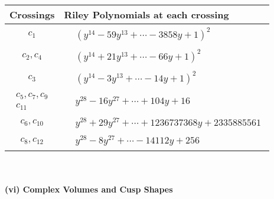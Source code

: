 \documentclass[1p]{elsarticle_modified}
\theoremstyle{definition}
\begin{document}
\begin{tabular}{m{50pt}|m{274pt}}
Crossings & \hspace{64pt}Riley Polynomials at each crossing \\
\hline $$\begin{aligned}c_{1}\end{aligned}$$&$\begin{aligned}
&(y^{14}-59 y^{13}+\cdots-3858 y+1)^{2}
\end{aligned}$\\
\hline $$\begin{aligned}c_{2},c_{4}\end{aligned}$$&$\begin{aligned}
&(y^{14}+21 y^{13}+\cdots-66 y+1)^{2}
\end{aligned}$\\
\hline $$\begin{aligned}c_{3}\end{aligned}$$&$\begin{aligned}
&(y^{14}-3 y^{13}+\cdots-14 y+1)^{2}
\end{aligned}$\\
\hline $$\begin{aligned}c_{5},c_{7},c_{9}\\c_{11}\end{aligned}$$&$\begin{aligned}
&y^{28}-16 y^{27}+\cdots+104 y+16
\end{aligned}$\\
\hline $$\begin{aligned}c_{6},c_{10}\end{aligned}$$&$\begin{aligned}
&y^{28}+29 y^{27}+\cdots+1236737368 y+2335885561
\end{aligned}$\\
\hline $$\begin{aligned}c_{8},c_{12}\end{aligned}$$&$\begin{aligned}
&y^{28}-8 y^{27}+\cdots-14112 y+256
\end{aligned}$\\
\hline
\end{tabular}\\~\\
\newpage\flushleft \textbf{(vi) Complex Volumes and Cusp Shapes}
\end{document}
